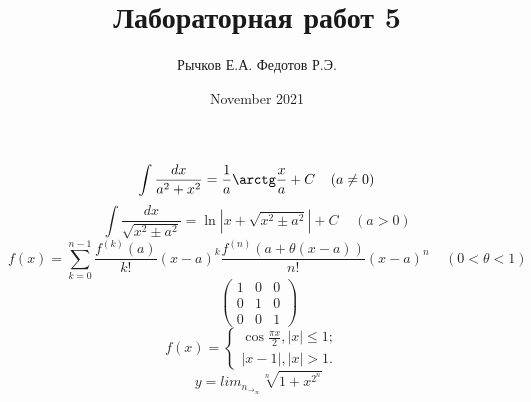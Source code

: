 \documentclass{article}
\title{Лабораторная работ 5}
\author{Рычков Е.А. Федотов Р.Э.}
\date{November 2021}
\begin{document}
\large
\begin{displaymath}
\int \frac{dx}{a^{2}+x^{2}}=\frac{1}{a}\arctg\frac{x}{a} + C \;\;\;\; (a \ne 0)
\end{displaymath}
\begin{displaymath}
\int \frac{dx}{\sqrt{x^{2} \pm a^{2}}} = \ln|x+\sqrt{x^{2}\pm a^{2}}| + C \;\;\;\; (a>0)
\end{displaymath}
\begin{displaymath}\
f(x)=\sum\limits_{k=0}^{n-1} 
\frac{f^{(k)}(a)}{k!}(x-a)^k
\frac{f^{(n)}(a+\theta(x-a))}{n!}(x-a)^n\;\;\;\; (0<\theta<1)
\end{displaymath}
\begin{displaymath}\
\begin{pmatrix} 1 & 0 & 0 \\0 & 1 & 0 \\0 & 0 & 1 \end{pmatrix}
\end{displaymath}
\begin{displaymath}\
f(x)= \begin{cases} \cos \frac{\pi x}{2}, |x|\leq 1; &\\
|x-1|,|x|>1. & \end{cases}
\end{displaymath}
\begin{displaymath}\
y=lim{_n_\to_\infty}\sqrt[n]{1+x^2^n}
\end{displaymath}
\end{document}
